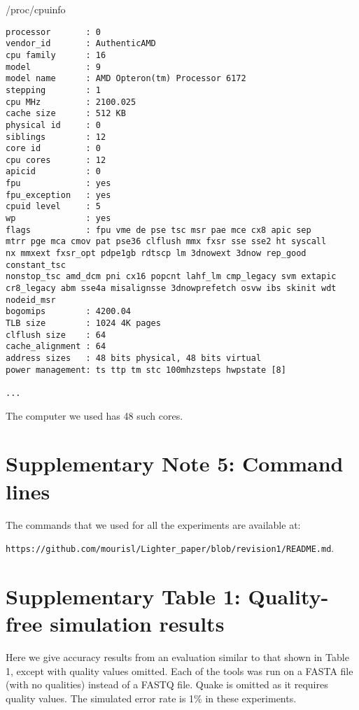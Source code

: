 \documentclass[10pt]{article}
\begin{document}
\noindent /proc/cpuinfo

\begin{verbatim}
processor       : 0
vendor_id       : AuthenticAMD
cpu family      : 16
model           : 9
model name      : AMD Opteron(tm) Processor 6172
stepping        : 1
cpu MHz         : 2100.025
cache size      : 512 KB
physical id     : 0
siblings        : 12
core id         : 0
cpu cores       : 12
apicid          : 0
fpu             : yes
fpu_exception   : yes
cpuid level     : 5
wp              : yes
flags           : fpu vme de pse tsc msr pae mce cx8 apic sep 
mtrr pge mca cmov pat pse36 clflush mmx fxsr sse sse2 ht syscall 
nx mmxext fxsr_opt pdpe1gb rdtscp lm 3dnowext 3dnow rep_good constant_tsc 
nonstop_tsc amd_dcm pni cx16 popcnt lahf_lm cmp_legacy svm extapic 
cr8_legacy abm sse4a misalignsse 3dnowprefetch osvw ibs skinit wdt nodeid_msr
bogomips        : 4200.04
TLB size        : 1024 4K pages
clflush size    : 64
cache_alignment : 64
address sizes   : 48 bits physical, 48 bits virtual
power management: ts ttp tm stc 100mhzsteps hwpstate [8]

...
\end{verbatim}
The computer we used has 48 such cores.
\clearpage

\section*{Supplementary Note 5: Command lines}
The commands that we used for all the experiments are available at:

\noindent\verb+https://github.com/mourisl/Lighter_paper/blob/revision1/README.md+.
\clearpage

\section*{Supplementary Table 1: Quality-free simulation results}

Here we give accuracy results from an evaluation similar to that shown in Table 1, except with quality values omitted.  Each of the tools was run on a FASTA file (with no qualities) instead of a FASTQ file.  Quake is omitted as it requires quality values.  The simulated error rate is 1\% in these experiments.
\end{document}
